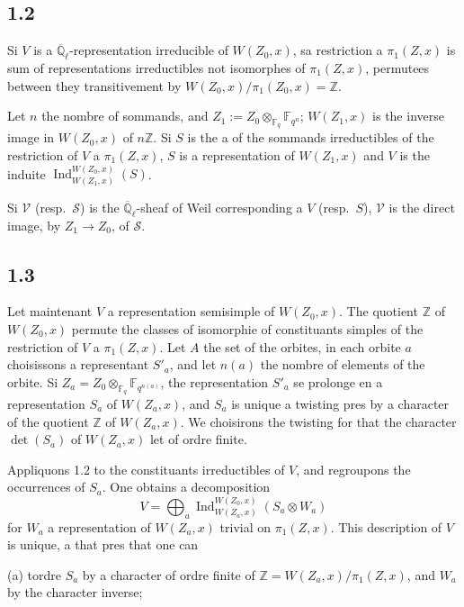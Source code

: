 \documentclass[11pt,a4paper]{article}
\theoremstyle{plain}
\theoremstyle{definition}
\DeclareMathOperator{\Ind}{Ind}
\begin{document}
\subsection{1.2}

Si $V$ is a $\overline{\mathbb{Q}}_\ell$-representation irreducible of $W(Z_0,x)$, sa restriction a $\pi_1(Z,x)$ is sum of representations irreductibles not isomorphes of $\pi_1(Z,x)$, permutees between they transitivement by $W(Z_0,x)/\pi_1(Z_0,x) = \mathbb{Z}$.

Let $n$ the nombre of sommands, and $Z_1 := Z_0 \otimes_{\mathbb{F}_q} \mathbb{F}_{q^n}$; $W(Z_1,x)$ is the inverse image in $W(Z_0,x)$ of $n\mathbb{Z}$. Si $S$ is the a of the sommands irreductibles of the restriction of $V$ a $\pi_1(Z,x)$, $S$ is a representation of $W(Z_1,x)$ and $V$ is the induite $\Ind_{W(Z_1,x)}^{W(Z_0,x)}(S)$.

Si $\mathcal{V}$ (resp.~$\mathcal{S}$) is the $\overline{\mathbb{Q}}_\ell$-sheaf of Weil corresponding a $V$ (resp.~$S$), $\mathcal{V}$ is the direct image, by $Z_1 \to Z_0$, of $\mathcal{S}$.

\subsection{1.3}

Let maintenant $V$ a representation semisimple of $W(Z_0,x)$. The quotient $\mathbb{Z}$ of $W(Z_0,x)$ permute the classes of isomorphie of constituants simples of the restriction of $V$ a $\pi_1(Z,x)$. Let $A$ the set of the orbites, in each orbite $a$ choisissons a representant $S'_a$, and let $n(a)$ the nombre of elements of the orbite. Si $Z_a = Z_0 \otimes_{\mathbb{F}_q} \mathbb{F}_{q^{n(a)}}$, the representation $S'_a$ se prolonge en a representation $S_a$ of $W(Z_a,x)$, and $S_a$ is unique a twisting pres by a character of the quotient $\mathbb{Z}$ of $W(Z_a,x)$. We choisirons the twisting for that the character $\det(S_a)$ of $W(Z_a,x)$ let of ordre finite.

Appliquons 1.2 to the constituants irreductibles of $V$, and regroupons the occurrences of $S_a$. One obtains a decomposition
\begin{equation}\label{eq:1.3.1}
V = \bigoplus_a \Ind_{W(Z_a,x)}^{W(Z_0,x)}(S_a \otimes W_a)
\end{equation}
for $W_a$ a representation of $W(Z_a,x)$ trivial on $\pi_1(Z,x)$. This description of $V$ is unique, a that pres that one can

(a) tordre $S_a$ by a character of ordre finite of $\mathbb{Z} = W(Z_a,x)/\pi_1(Z,x)$, and $W_a$ by the character inverse;
\end{document}
